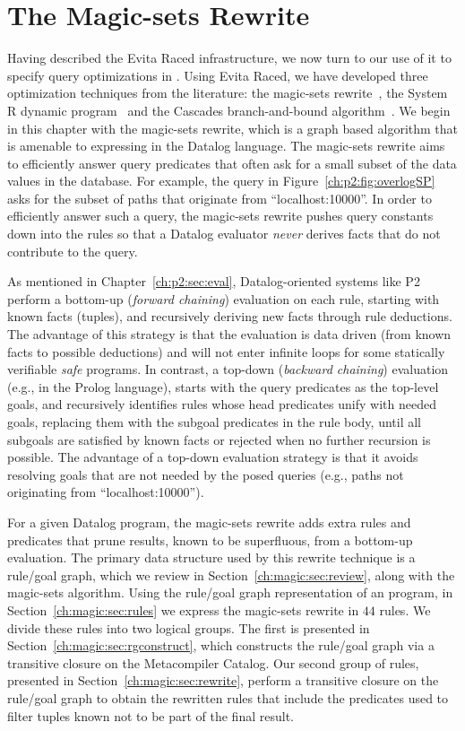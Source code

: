 \chapter[The Magic-sets Rewrite]{The Magic-sets Rewrite}
\label{ch:magic}

Having described the Evita Raced infrastructure, we now turn to our use of it
to specify query optimizations in \OVERLOG.  Using Evita Raced, we have
developed three optimization techniques from the literature: the magic-sets
rewrite~\cite{magic-sets1, magic-sets2}, the System R dynamic
program~\cite{selinger} and the Cascades branch-and-bound
algorithm~\cite{cascades}.  We begin in this chapter with the magic-sets
rewrite, which is a graph based algorithm that is amenable to expressing in the
Datalog language.  The magic-sets rewrite aims to efficiently answer query
predicates that often ask for a small subset of the data values in the
database.  For example, the  query in
Figure~\ref{ch:p2:fig:overlogSP} asks for the subset of paths that originate
from ``localhost:10000''.  In order to efficiently answer such a query, the
magic-sets rewrite pushes query constants down into the rules so that a Datalog
evaluator {\em never} derives facts that do not contribute to the query.

As mentioned in Chapter~\ref{ch:p2:sec:eval}, Datalog-oriented systems like P2
perform a bottom-up ({\em forward chaining}) evaluation on each rule, starting
with known facts (tuples), and recursively deriving new facts through rule
deductions.  The advantage of this strategy is that the evaluation is data
driven (from known facts to possible deductions) and will not enter infinite
loops for some statically verifiable {\em safe} programs.  In contrast, a
top-down ({\em backward chaining}) evaluation (e.g., in the Prolog language),
starts with the query predicates as the top-level goals, and recursively
identifies rules whose head predicates unify with needed goals, replacing them
with the subgoal predicates in the rule body, until all subgoals are satisfied
by known facts or rejected when no further recursion is possible.  The
advantage of a top-down evaluation strategy is that it avoids resolving goals
that are not needed by the posed queries (e.g., paths not originating from
``localhost:10000'').

For a given Datalog program, the magic-sets rewrite adds extra rules and
predicates that prune results, known to be superfluous, from a bottom-up
evaluation.  The primary data structure used by this rewrite technique is a
rule/goal graph, which we review in Section~\ref{ch:magic:sec:review}, along
with the magic-sets algorithm.  Using the rule/goal graph representation of an
\OVERLOG program, in Section~\ref{ch:magic:sec:rules} we express the magic-sets
rewrite in $44$ \OVERLOG rules.  We divide these rules into two logical groups.
The first is presented in Section~\ref{ch:magic:sec:rgconstruct}, which
constructs the rule/goal graph via a transitive closure on the Metacompiler
Catalog.  Our second group of rules, presented in
Section~\ref{ch:magic:sec:rewrite}, perform a transitive closure on the
rule/goal graph to obtain the rewritten rules that include the predicates used
to filter tuples known not to be part of the final result.

